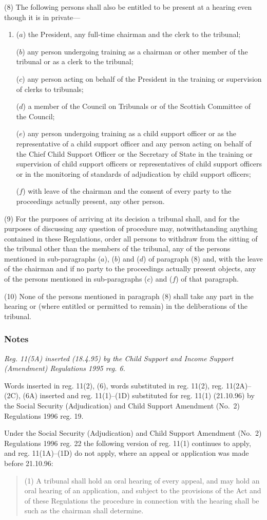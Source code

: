 \documentclass[a4paper]{article}
\newcommand\amendment[1]{\subsubsection*{Notes}{\itshape\frenchspacing\footnotesize #1 \par}}
\begin{document}
(8) The following persons shall also be entitled to be present at a hearing even though it is in private---
\begin{enumerate}\item[]
($a$) the President, any full-time chairman and the clerk to the tribunal;

($b$) any person undergoing training as a chairman or other member of the tribunal or as a clerk to the tribunal;

($c$) any person acting on behalf of the President in the training or supervision of clerks to tribunals;

($d$) a member of the Council on Tribunals or of the Scottish Committee of the Council;

($e$) any person undergoing training as a child support officer or as the representative of a child support officer and any person acting on behalf of the Chief Child Support Officer or the Secretary of State in the training or supervision of child support officers or representatives of child support officers or in the monitoring of standards of adjudication by child support officers;

($f$) with leave of the chairman and the consent of every party to the proceedings actually present, any other person.
\end{enumerate}

(9) For the purposes of arriving at its decision a tribunal shall, and for the purposes of discussing any question of procedure may, notwithstanding anything contained in these Regulations, order all persons to withdraw from the sitting of the tribunal other than the members of the tribunal, any of the persons mentioned in sub-paragraphs ($a$), ($b$) and ($d$) of paragraph (8) and, with the leave of the chairman and if no party to the proceedings actually present objects, any of the persons mentioned in sub-paragraphs ($c$) and ($f$) of that paragraph.

(10) None of the persons mentioned in paragraph (8) shall take any part in the hearing or (where entitled or permitted to remain) in the deliberations of the tribunal.

\amendment{
Reg. 11(5A) inserted (18.4.95) by the Child Support and Income Support (Amendment) Regulations 1995 reg. 6.

Words inserted in reg. 11(2), (6), words substituted in reg. 11(2), reg. 11(2A)--(2C), (6A) inserted and reg. 11(1)--(1D) substituted for reg. 11(1) (21.10.96) by the Social Security (Adjudication) and Child Support Amendment (No.\ 2) Regulations 1996 reg. 19.

Under the Social Security (Adjudication) and Child Support Amendment (No.\ 2) Regulations 1996 reg. 22 the following version of reg. 11(1) continues to apply, and reg. 11(1A)--(1D) do not apply, where an appeal or application was made before 21.10.96:
\begin{quotation}
(1) A tribunal shall hold an oral hearing of every appeal, and may hold an oral hearing of an application, and subject to the provisions of the Act and of these Regulations the procedure in connection with the hearing shall be such as the chairman shall determine.
\end{quotation}

}
\end{document}
